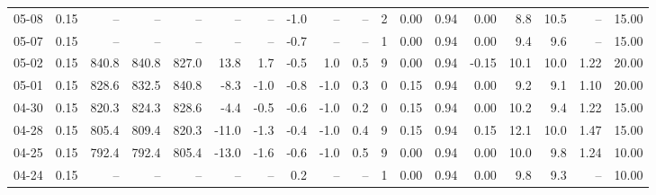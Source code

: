 \begin{threeparttable}
{\begin{tabular}{lrrrrrrrrrrrrrrrrr}
  05-08 &     0.15 &    -- &    -- &    -- &         -- &             -- &                      -1.0 &                       -- &                  -- &              2 &       0.00 &      0.94 &           0.00 &              8.8 &                10.5 &              -- &                  15.00 \\
  05-07 &     0.15 &    -- &    -- &    -- &         -- &             -- &                      -0.7 &                       -- &                  -- &              1 &       0.00 &      0.94 &           0.00 &              9.4 &                 9.6 &              -- &                  15.00 \\
  05-02 &     0.15 & 840.8 & 840.8 & 827.0 &       13.8 &            1.7 &                      -0.5 &                      1.0 &                 0.5 &              9 &       0.00 &      0.94 &          -0.15 &             10.1 &                10.0 &            1.22 &                  20.00 \\
  05-01 &     0.15 & 828.6 & 832.5 & 840.8 &       -8.3 &           -1.0 &                      -0.8 &                     -1.0 &                 0.3 &              0 &       0.15 &      0.94 &           0.00 &              9.2 &                 9.1 &            1.10 &                  20.00 \\
  04-30 &     0.15 & 820.3 & 824.3 & 828.6 &       -4.4 &           -0.5 &                      -0.6 &                     -1.0 &                 0.2 &              0 &       0.15 &      0.94 &           0.00 &             10.2 &                 9.4 &            1.22 &                  15.00 \\
  04-28 &     0.15 & 805.4 & 809.4 & 820.3 &      -11.0 &           -1.3 &                      -0.4 &                     -1.0 &                 0.4 &              9 &       0.15 &      0.94 &           0.15 &             12.1 &                10.0 &            1.47 &                  15.00 \\
  04-25 &     0.15 & 792.4 & 792.4 & 805.4 &      -13.0 &           -1.6 &                      -0.6 &                     -1.0 &                 0.5 &              9 &       0.00 &      0.94 &           0.00 &             10.0 &                 9.8 &            1.24 &                  10.00 \\
  04-24 &     0.15 &    -- &    -- &    -- &         -- &             -- &                       0.2 &                       -- &                  -- &              1 &       0.00 &      0.94 &           0.00 &              9.8 &                 9.3 &              -- &                  10.00 \\

\end{tabular}}
\end{threeparttable}
